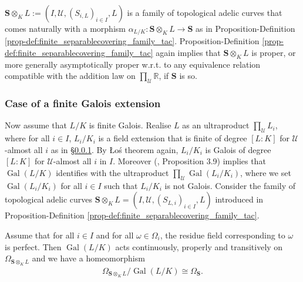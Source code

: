 \documentclass [11pt,reqno]{amsart}
\def\bR{{\mathbb{R}}}
\newcommand{\1}{\mathmybb{1}}
\def\cU{{\mathcal{U}}}
\DeclareMathOperator{\Gal}{Gal}
\begin{document}
\begin{proposition-definition}
\label{prop-def:algebraic_covering_family_tac}
$\mathbf{S}\otimes_{K} L := (I,\cU,(S_{i,L})_{i\in I},L)$ is a family of topological adelic curves that comes naturally with a morphism $\alpha_{L/K} : \mathbf{S}\otimes_{K} L\to \mathbf{S}$ as in Proposition-Definition \ref{prop-def:finite_separablecovering_family_tac}. Proposition-Definition \ref{prop-def:finite_separablecovering_family_tac} again implies that $\mathbf{S}\otimes_{K} L$ is proper, or more generally asymptotically proper w.r.t. to any equivalence relation compatible with the addition law on $\prod_{\cU}\bR$, if $\mathbf{S}$ is so.
\end{proposition-definition}

\subsubsection{Case of a finite Galois extension}
\label{subsub:finite_Galois_covering_family_tac}

Now assume that $L/K$ is finite Galois. Realise $L$ as an ultraproduct $\prod_{\cU}L_{i}$, where for all $i\in I$, $L_{i}/K_{i}$ is a field extension that is finite of degree $[L:K]$ for $\cU$-almost all $i$ as in \S \ref{subsub:finite_Galois_covering_family_tac}. By \L{}o\'s theorem again, $L_{i}/K_{i}$ is Galois of degree $[L:K]$ for $\cU$-almost all $i$ in $I$. Moreover (\cite{Nguyen24}, Proposition 3.9) implies that $\Gal(L/K)$ identifies with the ultraproduct $\prod_{\cU}\Gal(L_{i}/K_{i})$, where we set $\Gal(L_{i}/K_{i})$ for all $i\in I$ such that $L_{i}/K_{i}$ is not Galois. Consider the family of topological adelic curves $\mathbf{S}\otimes_{K} L=(I,\cU,(S_{L,i})_{i\in I}, L)$ introduced in Proposition-Definition \ref{prop-def:finite_separablecovering_family_tac}. 

\begin{proposition}
\label{prop:galois_action_covering_family_tac}
Assume that for all $i\in I$ and for all $\omega\in \Omega_{i}$, the residue field corresponding to $\omega$ is perfect. Then $\Gal(L/K)$ acts continuously, properly and transitively on $\Omega_{\mathbf{S}\otimes_{K}L}$ and we have a homeomorphism
\begin{align*}
\Omega_{\mathbf{S}\otimes_{K}L}/\Gal(L/K) \cong \Omega_{\mathbf{S}}.
\end{align*}
\end{proposition}
\end{document}
